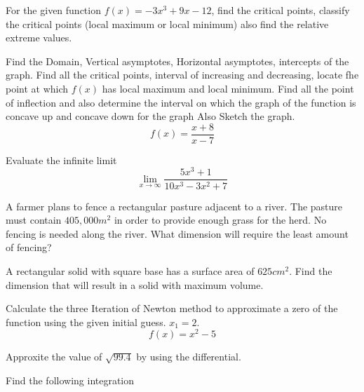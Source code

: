 \documentclass[11pt]{exam}
\begin{document}
\begin{questions}

\addpoints
\question[10] For the given function $f(x)=-3x^3+9x-12$, find the critical points, classify the critical points (local maximum or local minimum) also find the relative extreme values. 






\newpage
\addpoints
\question[20] Find the Domain, Vertical asymptotes, Horizontal asymptotes, intercepts of the graph. Find all the critical points, interval of increasing and decreasing, locate fhe point at which $f(x)$ has local maximum and local minimum. Find all the point of inflection and also determine the interval on which the graph of the function is concave up and concave down for the graph Also Sketch the graph. \[f(x)=\frac{x+8}{x-7}\]





\newpage
\addpoints
\question[5] Evaluate the infinite limit
\[ \lim\limits_{x\to \infty} \frac{5x^3+1}{10x^3-3x^2+7} \]






\vspace{8cm}
\addpoints
\question[10]A farmer plans to fence a rectangular pasture adjacent to a river. The pasture must contain $405,000 m^2$ in order to provide enough grass for the herd. No fencing is needed along the river. What dimension will require the least amount of fencing?



\vspace{8cm}
\addpoints
\question[10] A rectangular solid with square base has a surface area of $625cm^2$. Find the dimension that will result in a solid with maximum volume. 



\vspace{8cm}
\newpage
\addpoints
\question[5] Calculate the three Iteration of Newton method to approximate a zero of the function using the given initial guess. $x_1=2$. \[f(x)=x^2-5\]


\vspace{9cm}
\addpoints
\question[10] Approxite the value of $\sqrt{99.4}$ by using the differential. 


\newpage
\addpoints
\question[10] Find the following integration
\end{questions}
\end{document}

